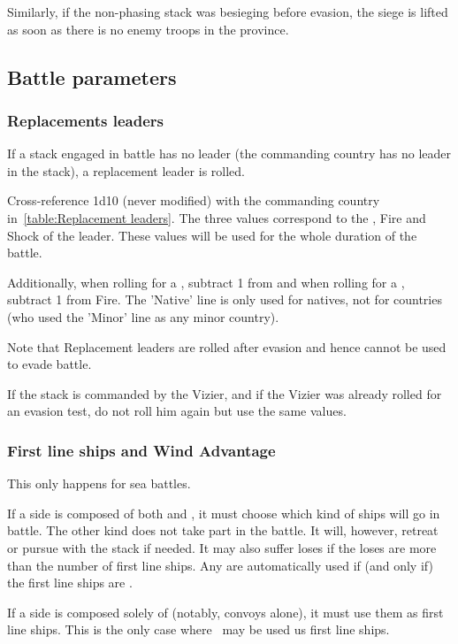Similarly, if the non-phasing stack was besieging before evasion, the siege is
lifted as soon as there is no enemy troops in the province.

\subsection{Battle parameters}
\label{chMilitary:Battle:Parameters}
\subsubsection{Replacements leaders}
If a stack engaged in battle has no leader (the commanding country has no
leader in the stack), a replacement leader is rolled.


Cross-reference 1d10 (never modified) with the commanding country
in~\ref{table:Replacement leaders}. The three values correspond to the \Man,
Fire and Shock of the leader. These values will be used for the whole duration
of the battle.

Additionally, when rolling for a \POL \LeaderA, subtract 1 from \Man and when
rolling for a \PRU \LeaderA, subtract 1 from Fire. The 'Native' line is only
used for natives, not for \ROTW countries (who used the 'Minor' line as any
minor country).

Note that Replacement leaders are rolled after evasion and hence cannot be
used to evade battle.

If the stack is commanded by the \TUR Vizier, and if the Vizier was already
rolled for an evasion test, do not roll him again but use the same values.

\subsubsection{First line ships and Wind Advantage}
This only happens for sea battles.

If a side is composed of both \NGD and \NWD, it must choose which kind of
ships will go in battle. The other kind does not take part in the battle. It
will, however, retreat or pursue with the stack if needed. It may also suffer
loses if the loses are more than the number of first line ships. Any \VGD are
automatically used if (and only if) the first line ships are \NGD.

If a side is composed solely of \NTD (notably, convoys alone), it must use
them as first line ships. This is the only case where \NTD may be used us
first line ships.

